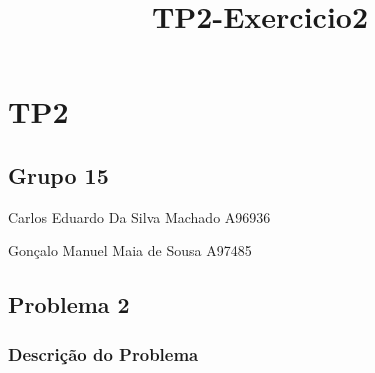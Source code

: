 \documentclass[11pt]{article}
\title{TP2-Exercicio2}
\begin{document}
    
    \maketitle
    
    

    
    \hypertarget{tp2}{%
\section{TP2}\label{tp2}}

\hypertarget{grupo-15}{%
\subsection{Grupo 15}\label{grupo-15}}

Carlos Eduardo Da Silva Machado A96936

Gonçalo Manuel Maia de Sousa A97485

    \hypertarget{problema-2}{%
\subsection{Problema 2}\label{problema-2}}

    \hypertarget{descriuxe7uxe3o-do-problema}{%
\subsubsection{Descrição do
Problema}\label{descriuxe7uxe3o-do-problema}}
\end{document}
